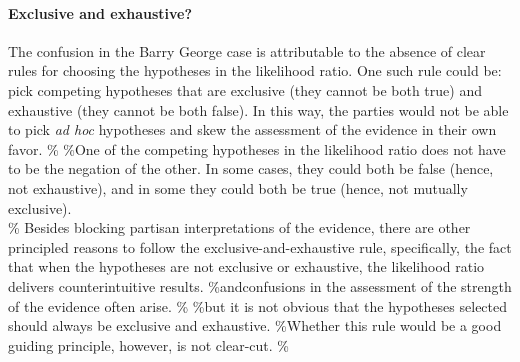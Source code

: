 \documentclass[10pt,dvipsnames,enabledeprecatedfontcommands]{scrartcl}
\let\oldparagraph\paragraph
\renewcommand{\paragraph}[1]{\oldparagraph{#1}\mbox{}}
\begin{document}
\paragraph{Exclusive and exhaustive?}

The confusion in the Barry George case is attributable to the absence of
clear rules for choosing the hypotheses in the likelihood ratio. One
such rule could be: pick competing hypotheses that are exclusive (they
cannot be both true) and exhaustive (they cannot be both false). In this
way, the parties would not be able to pick \textit{ad hoc} hypotheses
and skew the assessment of the evidence in their own favor. \% \%One of
the competing hypotheses in the likelihood ratio does not have to be the
negation of the other. In some cases, they could both be false (hence,
not exhaustive), and in some they could both be true (hence, not
mutually exclusive).\\
\% Besides blocking partisan interpretations of the evidence, there are
other principled reasons to follow the exclusive-and-exhaustive rule,
specifically, the fact that when the hypotheses are not exclusive or
exhaustive, the likelihood ratio delivers counterintuitive results.
\%andconfusions in the assessment of the strength of the evidence often
arise. \% \%but it is not obvious that the hypotheses selected should
always be exclusive and exhaustive. \%Whether this rule would be a good
guiding principle, however, is not clear-cut. \%
\end{document}
